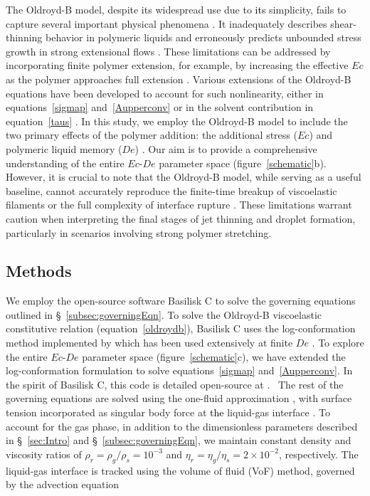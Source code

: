\documentclass{jfm}
\newcommand{\DL}[1]{{\textcolor{black}{#1}}}
\newcommand{\AO}[1]{{\textcolor{black}{#1}}}
\newcommand{\oo}{\color{black} \normalfont}
\newcommand{\bb}{\color{black} \normalfont}
\begin{document}
The Oldroyd-B model, despite its widespread use due to \AO{its} simplicity, fails to capture several important physical phenomena \citep{snoeijer2020relationship}. It inadequately describes shear-thinning behavior in polymeric liquids \citep{yamani2023master} and erroneously predicts unbounded stress growth in strong extensional flows \citep{mckinley2002filament, eggers2020self}. 
These limitations can be addressed by incorporating finite polymer extension, for example, by increasing the effective $Ec$ as the polymer approaches full extension \citep{hinch2021oldroyd,zinelis2023transition}. Various extensions of the Oldroyd-B equations have been developed to account for such nonlinearity, either in equations~\eqref{sigmap} and~\eqref{Aupperconv} or in the solvent contribution in equation~\eqref{taus} \citep{de1974coil,tanner2000engineering,mckinley2002filament,alves2021numerical}. In this study, we employ the Oldroyd-B model to include the two primary effects of the polymer addition: the additional stress ($Ec$) and polymeric liquid memory ($De$) \citep{snoeijer2020relationship}. Our aim is to provide a comprehensive understanding of the entire $Ec$-$De$ parameter space (figure~\ref{schematic}b).
\oo 
However, it is crucial to note that the Oldroyd-B model, while serving as a useful baseline, cannot accurately reproduce the finite-time breakup of viscoelastic filaments \citep{eggers2020self} or the full complexity of interface rupture \citep{lohse-2020-pnas}. These limitations warrant caution when interpreting the final stages of jet thinning and droplet formation, particularly in scenarios involving strong polymer stretching.
\bb


\subsection {Methods}

We employ the open-source software Basilisk C \citep{basilliskpopinet, popinet2015quadtree} to solve the governing equations outlined in \S~\ref{subsec:governingEqn}.
\oo
To solve the Oldroyd-B viscoelastic constitutive relation (equation~\eqref{oldroydb}), Basilisk C uses the log-conformation method \citep{fattal2004constitutive} implemented by \citet{lopez2019adaptive} which has been used extensively at finite $De$ \citep{turkoz2018axisymmetric, turkoz2021simulation}. To explore the entire $Ec$-$De$ parameter space  (figure~\ref{schematic}c), we have extended the log-conformation formulation to solve equations~\eqref{sigmap} and~\eqref{Aupperconv}. In the spirit of Basilisk C, this code is detailed open-source at \citet{vatsalElastoFlow2024}.\bb\,
The rest of the governing equations are solved using the one-fluid approximation \citep{tryggvason2011direct}, with surface tension incorporated as singular body force at \DL{the} liquid-gas interface \citep{brackbill1992continuum}.
To account for the gas phase, in addition to the dimensionless parameters described in \S~\ref{sec:Intro} and \S~\ref{subsec:governingEqn}, we maintain constant density and viscosity ratios of $\rho_{r} = \rho_{g}/\rho_{s} = 10^{-3}$ and $\eta_{r} = \eta_{g}/\eta_{s} = 2 \times 10^{-2}$, respectively.
The liquid-gas interface is tracked using the volume of fluid (VoF) method, governed by the advection equation
\end{document}
